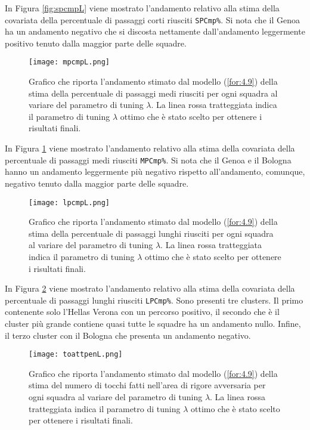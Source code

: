 In Figura \ref{fig:spcmpL} viene mostrato l'andamento relativo alla stima della covariata della percentuale di passaggi corti riusciti \texttt{SPCmp\%}. Si nota che il Genoa ha un andamento negativo che si discosta nettamente dall'andamento leggermente positivo tenuto dalla maggior parte delle squadre.

\begin{figure}[htbp]
	\begin{center}
		\texttt{[image: mpcmpL.png]}
		\caption{Grafico che riporta l'andamento stimato dal modello (\ref{for:4.9}) della stima della percentuale di passaggi medi riusciti per ogni squadra al variare del parametro di tuning $\lambda$. La linea rossa tratteggiata indica il parametro di tuning $\lambda$ ottimo che è stato scelto per ottenere i risultati finali.} \label{fig:mpcmpL}
	\end{center}
\end{figure}

In Figura \ref{fig:mpcmpL} viene mostrato l'andamento relativo alla stima della covariata della percentuale di passaggi medi riusciti \texttt{MPCmp\%}. Si nota che il Genoa e il Bologna hanno un andamento leggermente più negativo rispetto all’andamento, comunque, negativo tenuto dalla maggior parte delle squadre.

\begin{figure}[htbp]
	\begin{center}
		\texttt{[image: lpcmpL.png]}
		\caption{Grafico che riporta l'andamento stimato dal modello (\ref{for:4.9}) della stima della percentuale di passaggi lunghi riusciti per ogni squadra al variare del parametro di tuning $\lambda$. La linea rossa tratteggiata indica il parametro di tuning $\lambda$ ottimo che è stato scelto per ottenere i risultati finali.} \label{fig:lpcmpL}
	\end{center}
\end{figure}

In Figura \ref{fig:lpcmpL} viene mostrato l'andamento relativo alla stima della covariata della percentuale di passaggi lunghi riusciti \texttt{LPCmp\%}. Sono presenti tre clusters. Il primo contenente solo l'Hellas Verona con un percorso positivo, il secondo che è il cluster più grande contiene quasi tutte le squadre ha un andamento nullo. Infine, il terzo cluster con il Bologna che presenta un andamento negativo.

\begin{figure}[htbp]
	\begin{center}
		\texttt{[image: toattpenL.png]}
		\caption{Grafico che riporta l'andamento stimato dal modello (\ref{for:4.9}) della stima del numero di tocchi fatti nell'area di rigore avversaria per ogni squadra al variare del parametro di tuning $\lambda$. La linea rossa tratteggiata indica il parametro di tuning $\lambda$ ottimo che è stato scelto per ottenere i risultati finali.} \label{fig:toattpenL}
	\end{center}
\end{figure}

